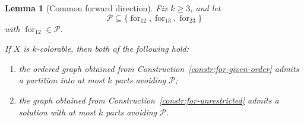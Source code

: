 \documentclass[12pt]{article}
\theoremstyle{plain}
\newtheorem{lemma}[theorem]{Lemma}
\theoremstyle{definition}
\theoremstyle{remark}
\theoremstyle{definition}
\newcommand{\forlabel}{\mathrm{for}}
\DeclareRobustCommand{\forparam}[1]{%
  \ensuremath{\mathop{\forlabel}\nolimits_{#1}}%
}
\begin{document}
\begin{lemma}[Common forward direction]
\label{lem:for-common-forward}
Fix \(k\ge 3\), and let
\[
\mathcal P\subseteq
\{\forparam{12},\forparam{13},\forparam{23}\}
\]
with \(\forparam{12}\in\mathcal P\).

If \(X\) is \(k\)-colorable, then both of the following hold:
\begin{enumerate}
    \item the ordered graph obtained from
    Construction~\ref{constr:for-given-order}
    admits a partition into at most \(k\) parts avoiding \(\mathcal P\);

    \item the graph obtained from
    Construction~\ref{constr:for-unrestricted}
    admits a solution with at most \(k\) parts avoiding \(\mathcal P\).
\end{enumerate}
\end{lemma}
\end{document}
